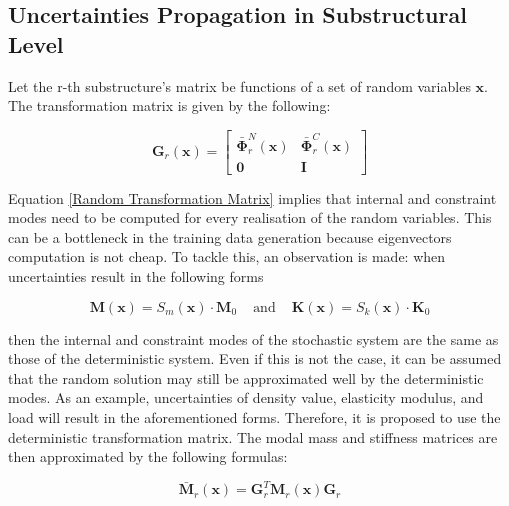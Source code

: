 \documentclass[../DomainDecomposition.tex]{subfiles}
\begin{document}
 

\subsection{Uncertainties Propagation in Substructural Level}

Let the r-th substructure's matrix be functions of a set of random variables $\mathbf{x}$. 
The transformation matrix is given by the following: 

\begin{equation}
    \mathbf{G}_{r} \left(\mathbf{x}\right)
    =
    \begin{bmatrix}
        \bar{\mathbf{\Phi}}_{r}^{N} \left(\mathbf{x}\right) & 
        \bar{\mathbf{\Phi}}_{r}^{C} \left(\mathbf{x}\right) \\
        \mathbf{0} & \mathbf{I} 
    \end{bmatrix}
    \label{Random Transformation Matrix}
\end{equation}

Equation \eqref{Random Transformation Matrix} implies that internal and constraint modes need to be computed for every realisation of the random variables. 
This can be a bottleneck in the training data generation because eigenvectors computation is not cheap.  
To tackle this, an observation is made: when uncertainties result in the following forms 

\begin{equation*}
    \mathbf{M} \left(\mathbf{x}\right) 
    =
    S_{m} \left(\mathbf{x}\right) 
    \cdot 
    \mathbf{M}_{0} 
    \phantom{xx}
    \text{and} 
    \phantom{xx}
    \mathbf{K} \left(\mathbf{x}\right) 
    =
    S_{k} \left(\mathbf{x}\right) 
    \cdot 
    \mathbf{K}_{0} 
\end{equation*}

then the internal and constraint modes of the stochastic system are the same as those of the deterministic system. 
Even if this is not the case, it can be assumed that the random solution may still be approximated well by the deterministic modes.
As an example, uncertainties of density value, elasticity modulus, and load will result in the aforementioned forms.  
Therefore, it is proposed to use the deterministic transformation matrix. 
The modal mass and stiffness matrices are then approximated by the following formulas: 

\begin{equation}
    \bar{\mathbf{M}}_{r} \left(\mathbf{x}\right) 
    =
    \mathbf{G}_{r}^{T} 
    \mathbf{M}_{r} \left(\mathbf{x}\right) 
    \mathbf{G}_{r} 
\end{equation}
\end{document}
